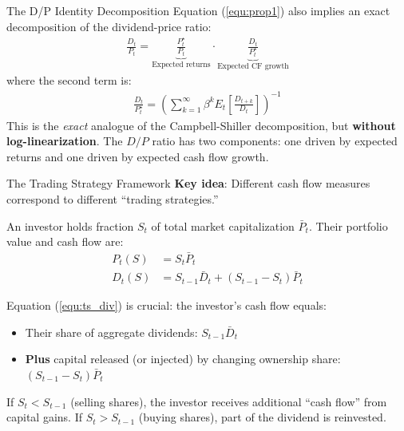 \documentclass{beamer}
\begin{document}
\begin{frame}{The D/P Identity Decomposition}
	Equation (\ref{equ:prop1}) also implies an exact decomposition of the dividend-price ratio:
	\begin{align}
		\frac{D_t}{P_t} = \underbrace{\frac{P_t^\star}{P_t}}_{\text{Expected returns}} \cdot \underbrace{\frac{D_t}{P_t^\star}}_{\text{Expected CF growth}} \label{equ:dp_decomp}
	\end{align}
	where the second term is:
	\begin{align*}
		\frac{D_t}{P_t^\star} = \left(\sum_{k=1}^{\infty} \beta^k E_t\left[\frac{D_{t+k}}{D_t}\right]\right)^{-1}
	\end{align*}
	This is the \textit{exact} analogue of the Campbell-Shiller decomposition, but \textbf{without log-linearization}. The $D/P$ ratio has two components: one driven by expected returns and one driven by expected cash flow growth.
\end{frame}

\begin{frame}{The Trading Strategy Framework}
	\textbf{Key idea}: Different cash flow measures correspond to different ``trading strategies.''

	\vspace{5pt}
	An investor holds fraction $S_t$ of total market capitalization $\bar{P}_t$. Their portfolio value and cash flow are:
	\begin{align}
		P_t(S) &= S_t \bar{P}_t \label{equ:ts_price}\\
		D_t(S) &= S_{t-1}\bar{D}_t + (S_{t-1} - S_t)\bar{P}_t \label{equ:ts_div}
	\end{align}

	\vspace{5pt}
	Equation (\ref{equ:ts_div}) is crucial: the investor's cash flow equals:
	\begin{itemize}
		\item Their share of aggregate dividends: $S_{t-1}\bar{D}_t$
		\item \textbf{Plus} capital released (or injected) by changing ownership share: $(S_{t-1} - S_t)\bar{P}_t$
	\end{itemize}
	If $S_t < S_{t-1}$ (selling shares), the investor receives additional ``cash flow'' from capital gains. If $S_t > S_{t-1}$ (buying shares), part of the dividend is reinvested.
\end{frame}
\end{document}
